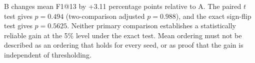 B changes mean F1@13 by +3.11 percentage points relative to A. The paired $t$ test gives $p=0.494$ (two-comparison adjusted $p=0.988$), and the exact sign-flip test gives $p=0.5625$. Neither primary comparison establishes a statistically reliable gain at the 5\% level under the exact test. Mean ordering must not be described as an ordering that holds for every seed, or as proof that the gain is independent of thresholding.
